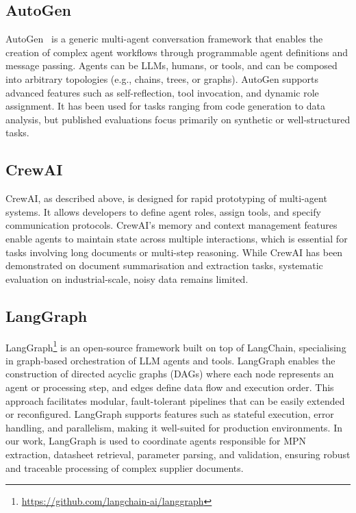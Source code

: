 \subsection{AutoGen}
AutoGen~\cite{wu2023autogen} is a generic multi-agent conversation framework that enables the creation of complex agent workflows through programmable agent definitions and message passing. Agents can be LLMs, humans, or tools, and can be composed into arbitrary topologies (e.g., chains, trees, or graphs). AutoGen supports advanced features such as self-reflection, tool invocation, and dynamic role assignment. It has been used for tasks ranging from code generation to data analysis, but published evaluations focus primarily on synthetic or well-structured tasks.

\subsection{CrewAI}
CrewAI, as described above, is designed for rapid prototyping of multi-agent systems. It allows developers to define agent roles, assign tools, and specify communication protocols. CrewAI's memory and context management features enable agents to maintain state across multiple interactions, which is essential for tasks involving long documents or multi-step reasoning. While CrewAI has been demonstrated on document summarisation and extraction tasks, systematic evaluation on industrial-scale, noisy data remains limited.

\subsection{LangGraph}
LangGraph\footnote{\url{https://github.com/langchain-ai/langgraph}} is an open-source framework built on top of LangChain, specialising in graph-based orchestration of LLM agents and tools. LangGraph enables the construction of directed acyclic graphs (DAGs) where each node represents an agent or processing step, and edges define data flow and execution order. This approach facilitates modular, fault-tolerant pipelines that can be easily extended or reconfigured. LangGraph supports features such as stateful execution, error handling, and parallelism, making it well-suited for production environments. In our work, LangGraph is used to coordinate agents responsible for MPN extraction, datasheet retrieval, parameter parsing, and validation, ensuring robust and traceable processing of complex supplier documents.

